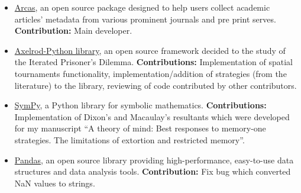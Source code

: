 \begin{itemize}
\item \href{https://github.com/ArcasProject/Arcas}{Arcas}, an open source
package designed to help users collect academic articles' metadata from
various prominent journals and pre print serves.
\textbf{Contribution:} Main developer.

\item \href{https://github.com/Axelrod-Python}{Axelrod-Python
library}, an open source framework decided to the study of the
Iterated Prisoner's Dilemma.
\textbf{Contributions:} Implementation of spatial tournaments functionality,
	implementation/addition of strategies (from the literature) to the library,
	reviewing of code contributed by other contributors.

\item \href{https://www.sympy.org/en/index.html}{SymPy},
a Python library for symbolic mathematics.
\textbf{Contributions:} Implementation of Dixon's and Macaulay's resultants
which were developed for my manuscript ``A theory of mind: Best responses to
memory-one strategies. The limitations of extortion and restricted memory''.

\item\href{https://pandas.pydata.org}{Pandas}, an open source library providing
high-performance, easy-to-use data structures and data analysis tools.
\textbf{Contribution:} Fix bug which converted NaN values to strings.
\end{itemize}